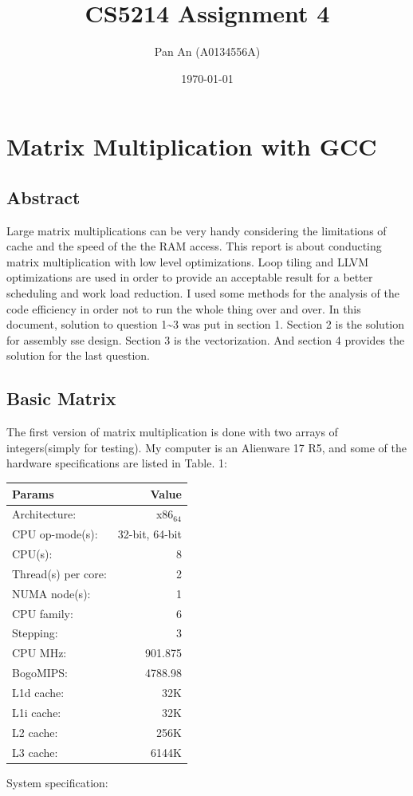 \documentclass[11pt]{article}
\author{Pan An (A0134556A)}
\date{\today}
\title{CS5214 Assignment 4}
\begin{document}
\maketitle
\tableofcontents

\section{Matrix Multiplication with GCC}
\label{sec:orgheadline6}

\subsection{Abstract}
\label{sec:orgheadline1}
Large matrix multiplications can be very handy considering 
the limitations of cache and the speed of the the RAM access.
This report is about conducting matrix multiplication with 
low level optimizations. Loop tiling and LLVM optimizations
are used in order to provide an acceptable result for a better
scheduling and work load reduction. I used some methods for 
the analysis of the code efficiency in order not to run the whole thing
over and over. In this document, solution to question 1\textasciitilde{}3 was put in section 1. 
Section 2 is the solution for assembly sse design. Section 3 is the vectorization. 
And section 4 provides the solution for the last question. 

\subsection{Basic Matrix}
\label{sec:orgheadline4}
The first version of matrix multiplication is done with
 two arrays of integers(simply for testing). My computer is 
an Alienware 17 R5, and some of the hardware specifications are listed
in Table. 1:


\begin{center}
\begin{tabular}{lr}
\hline
\hline
Params & Value\\
\hline
Architecture: & x86\(_{\text{64}}\)\\
CPU op-mode(s): & 32-bit, 64-bit\\
CPU(s): & 8\\
Thread(s) per core: & 2\\
NUMA node(s): & 1\\
CPU family: & 6\\
Stepping: & 3\\
CPU MHz: & 901.875\\
BogoMIPS: & 4788.98\\
L1d cache: & 32K\\
L1i cache: & 32K\\
L2 cache: & 256K\\
L3 cache: & 6144K\\
\hline
\end{tabular}
\end{center}
System specification:
\end{document}
